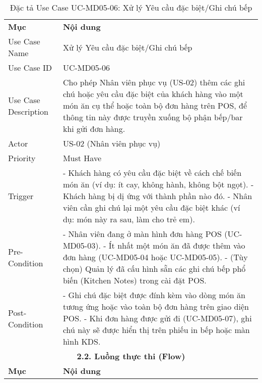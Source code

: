 \begin{longtable}{|m{4cm}|p{11cm}|}
\caption{Đặc tả Use Case UC-MD05-06: Xử lý Yêu cầu đặc biệt/Ghi chú bếp} \label{tab:uc_md05_06} \\
\hline

\endhead %
\hline
\endfoot %
\hline
\endlastfoot %
\multicolumn{2}{|c|}{\textbf{2.1. Tóm tắt (Summary)}} \\
\hline
\textbf{Mục} & \textbf{Nội dung} \\
\hline
Use Case Name & Xử lý Yêu cầu đặc biệt/Ghi chú bếp \\
\hline
Use Case ID & UC-MD05-06 \\
\hline
Use Case Description & Cho phép Nhân viên phục vụ (US-02) thêm các ghi chú hoặc yêu cầu đặc biệt của khách hàng vào một món ăn cụ thể hoặc toàn bộ đơn hàng trên POS, để thông tin này được truyền xuống bộ phận bếp/bar khi gửi đơn hàng. \\
\hline
Actor & US-02 (Nhân viên phục vụ) \\
\hline
Priority & Must Have \\
\hline
Trigger & - Khách hàng có yêu cầu đặc biệt về cách chế biến món ăn (ví dụ: ít cay, không hành, không bột ngọt). \newline - Khách hàng bị dị ứng với thành phần nào đó. \newline - Nhân viên cần ghi chú lại một yêu cầu đặc biệt khác (ví dụ: món này ra sau, làm cho trẻ em). \\
\hline
Pre-Condition & - Nhân viên đang ở màn hình đơn hàng POS (UC-MD05-03). \newline - Ít nhất một món ăn đã được thêm vào đơn hàng (UC-MD05-04 hoặc UC-MD05-05). \newline - (Tùy chọn) Quản lý đã cấu hình sẵn các ghi chú bếp phổ biến (Kitchen Notes) trong cài đặt POS. \\
\hline
Post-Condition & - Ghi chú đặc biệt được đính kèm vào dòng món ăn tương ứng hoặc vào toàn bộ đơn hàng trên giao diện POS. \newline - Khi đơn hàng được gửi đi (UC-MD05-07), ghi chú này sẽ được hiển thị trên phiếu in bếp hoặc màn hình KDS. \\
\hline
\multicolumn{2}{|c|}{\textbf{2.2. Luồng thực thi (Flow)}} \\
\hline
\textbf{Mục} & \textbf{Nội dung} \\
\hline

\end{longtable}
